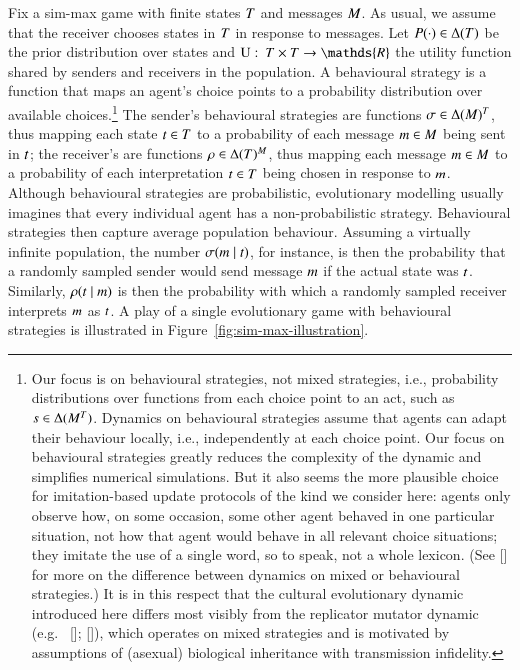\documentclass[12pt,english]{article}
\renewcommand{\Pr}{\ensuremath{P}}
\numberwithin{equation}{section}
\newcommand{\citealtbjps}[1]{\citeauthor{#1} [\citeyear{#1}]}
\begin{document}
Fix a sim-max game with finite states $T$ and messages $M$. As usual, we assume
that the receiver chooses states in $T$ in response to messages. Let
$\Pr(\cdot) \in \Delta(\States)$ be the prior distribution over states and
$\Util \mycolon \States \times \States \rightarrow \mathds{R}$ the utility function shared by
senders and receivers in the population. A behavioural strategy is a function that maps
an agent's choice points to a probability distribution over available
choices.\footnote{\label{fn:mixedStrats}Our focus is on behavioural strategies, not mixed
    strategies, i.e., probability distributions over functions from each choice point to an
  act, such as $s \in \Delta(M^{T})$.  Dynamics on behavioural strategies assume
  that agents can adapt their behaviour locally, i.e., independently at each choice point. Our
  focus on behavioural strategies greatly reduces the complexity of the dynamic and simplifies
  numerical simulations. But it also seems the more plausible choice for imitation-based update
  protocols of the kind we consider here: agents only observe how, on some occasion, some other
  agent behaved in one particular situation, not how that agent would behave in
  all relevant choice situations; they imitate the use of a single word, so to speak,
  not a whole lexicon. (See \citealtbjps{Cressman2003:Evolutionary-Dy} for more on the difference
  between dynamics on mixed or behavioural strategies.) It is in this respect that the cultural
  evolutionary dynamic introduced here differs most visibly from the replicator mutator dynamic
  (e.g.~\citealtbjps{NowakPlotkin2000:The-Evolution-o}; \citealtbjps{NowakKomarova2001:Evolution-of-Un}), which
  operates on mixed strategies and is motivated by assumptions of (asexual) biological
  inheritance with transmission infidelity.} The sender's behavioural strategies are
functions $\sigma \in \Delta(M)^T$, thus mapping each state $t \in T$
to a probability of each message $m \in M$ being sent in $t$; the receiver's
are functions $\rho \in \Delta(T)^M$, thus mapping each message
$m \in M$ to a probability of each interpretation $t \in T$ being chosen
in response to $m$. Although behavioural strategies are probabilistic, evolutionary
modelling usually imagines that every individual agent has a non-probabilistic
strategy. Behavioural strategies then capture average population behaviour. Assuming a virtually
infinite population, the number $\sigma(m \mid t)$, for instance, is then the
probability that a randomly sampled sender would send message $m$ if the actual state was
$t$. Similarly, $\rho(t \mid m)$ is then the probability with which a
randomly sampled receiver interprets $m$ as $t$. A play of a single evolutionary game
with behavioural strategies is illustrated in Figure~\ref{fig:sim-max-illustration}.
\end{document}
